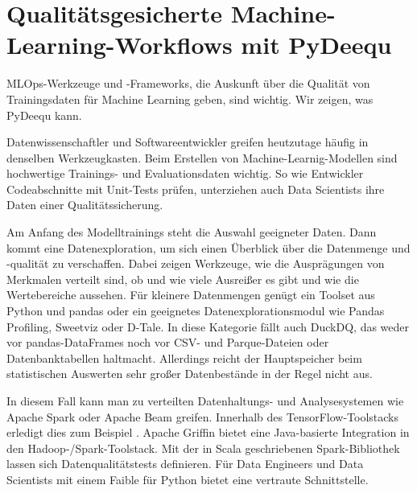 %
%
%
%




\chapter{Qualitätsgesicherte Machine-Learning-Workflows mit PyDeequ}

MLOps-Werkzeuge und -Frameworks, die Auskunft über die Qualität von Trainingsdaten für Machine Learning geben, sind wichtig. Wir zeigen, was PyDeequ kann.

Datenwissenschaftler und Softwareentwickler greifen heutzutage häufig in denselben Werkzeugkasten. Beim Erstellen von Machine-Learnig-Modellen sind hochwertige Trainings- und Evaluationsdaten wichtig. So wie Entwickler Codeabschnitte mit Unit-Tests prüfen, unterziehen auch Data Scientists ihre Daten einer Qualitätssicherung.

Am Anfang des Modelltrainings steht die Auswahl geeigneter Daten. Dann kommt eine Datenexploration, um sich einen Überblick über die Datenmenge und -qualität zu verschaffen. Dabei zeigen Werkzeuge, wie die Ausprägungen von Merkmalen verteilt sind, ob und wie viele Ausreißer es gibt und wie die Wertebereiche aussehen. Für kleinere Datenmengen genügt ein Toolset aus Python und pandas oder ein geeignetes Datenexplorationsmodul wie Pandas Profiling, Sweetviz oder D-Tale. In diese Kategorie fällt auch DuckDQ, das weder vor pandas-DataFrames noch vor CSV- und Parque-Dateien oder Datenbanktabellen haltmacht. Allerdings reicht der Hauptspeicher beim statistischen Auswerten sehr großer Datenbestände in der Regel nicht aus.

In diesem Fall kann man zu verteilten Datenhaltungs- und Analysesystemen wie Apache Spark oder Apache Beam greifen. Innerhalb des TensorFlow-Toolstacks erledigt dies zum Beispiel . Apache Griffin bietet eine Java-basierte Integration in den Hadoop-/Spark-Toolstack. Mit der in Scala geschriebenen Spark-Bibliothek  lassen sich Datenqualitätstests definieren. Für Data Engineers und Data Scientists mit einem Faible für Python bietet  eine vertraute Schnittstelle.

